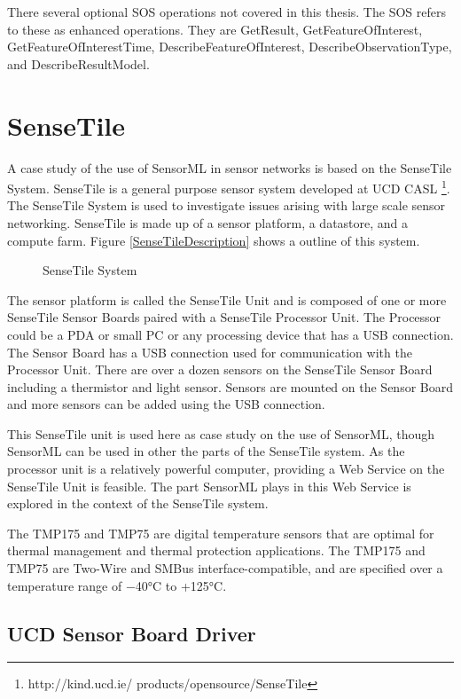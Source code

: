 \documentclass[]{final_report}
\begin{document}
There several optional SOS operations not covered in this thesis. The SOS refers to these as enhanced operations. They are GetResult, GetFeatureOfInterest, GetFeatureOfInterestTime, DescribeFeatureOfInterest, DescribeObservationType, and DescribeResultModel. 


\section{SenseTile}
A case study of the use of SensorML in sensor networks is based on the SenseTile System. SenseTile is a general purpose sensor system developed at UCD CASL \footnote{http://kind.ucd.ie/
products/opensource/SenseTile}. The SenseTile System is used to investigate issues arising with large scale sensor networking. SenseTile is made up of a sensor platform, a datastore, and a compute farm. Figure \ref{SenseTileDescription} shows a outline of this system. 
\begin{figure}[h]
\centering
{}
\caption{SenseTile System}\label{fig:SenseTileDescription}
\end{figure}
 The sensor platform is called the SenseTile Unit and is composed of one or more SenseTile Sensor Boards paired with a SenseTile Processor Unit. The Processor could be a PDA or small PC or any processing device that has a USB connection.  The Sensor Board has a USB connection used for communication with the Processor Unit. There are over a dozen sensors on the SenseTile Sensor Board including a thermistor and light sensor. Sensors are mounted on the Sensor Board and more sensors can be added using the USB connection.

This SenseTile unit is used here as case study on the use of SensorML, though SensorML can be used in other the parts of the SenseTile system. As the processor unit is a relatively powerful computer, providing a Web Service on the SenseTile Unit is feasible. The part SensorML plays in this Web Service is explored in the context of the SenseTile system.

The TMP175 and TMP75 are digital temperature sensors
that are optimal for thermal management and thermal
protection applications. The TMP175 and TMP75 are
Two-Wire and SMBus interface-compatible, and are
specified over a temperature range of −40°C to +125°C.

\subsection{UCD Sensor Board Driver}\label{SensorBoardDriverSec}
\end{document}
